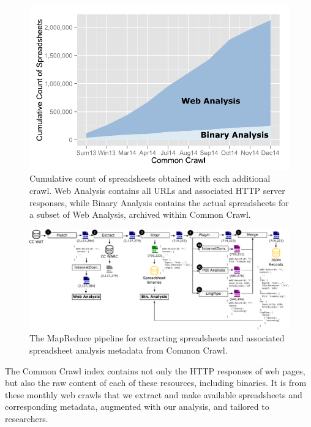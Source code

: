 \documentclass{svjour3}
\begin{document}
\begin{figure}[!t]
\centering
% 
\includegraphics[width=\columnwidth]{figures/stack}
\caption{Cumulative count of spreadsheets obtained with each additional crawl. Web Analysis contains all URLs and associated HTTP server responses, while Binary Analysis contains the actual spreadsheets for a subset of Web Analysis, archived within Common Crawl.\label{fig:rplot}}
\end{figure}

\begin{figure}[!t]
\centering
\includegraphics[width=\linewidth]{figures/pipeline}
\caption{The MapReduce pipeline for extracting spreadsheets and associated spreadsheet analysis metadata from Common Crawl.\label{fig:mrpipeline}}
\end{figure}

The Common Crawl index contains not only the HTTP responses of web pages, but also the raw content of each of these resources, including binaries. It is from these monthly web crawls that we extract and make available spreadsheets and corresponding metadata, augmented with our analysis, and tailored to researchers.
\end{document}
